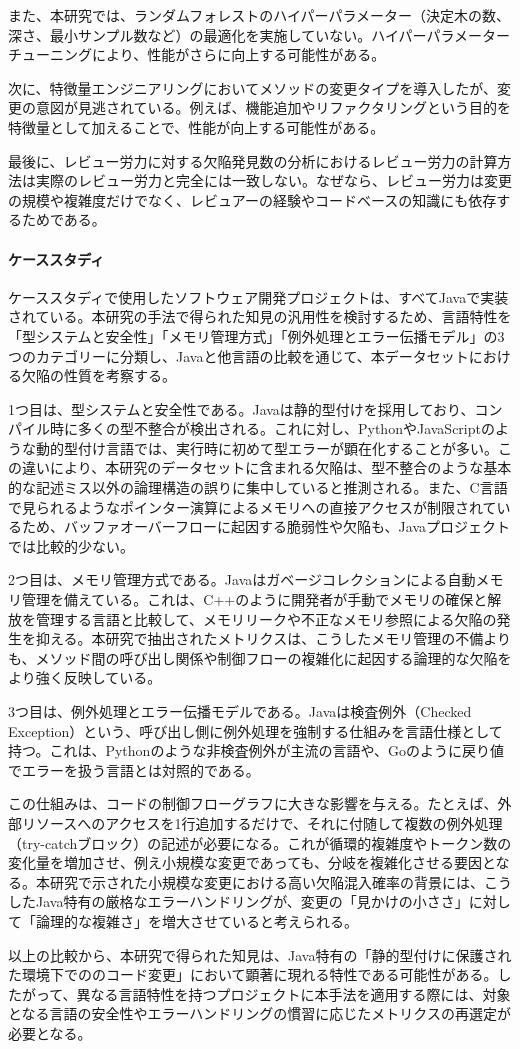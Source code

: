 また、本研究では、ランダムフォレストのハイパーパラメーター（決定木の数、深さ、最小サンプル数など）の最適化を実施していない。ハイパーパラメーターチューニングにより、性能がさらに向上する可能性がある。

次に、特徴量エンジニアリングにおいてメソッドの変更タイプを導入したが、変更の意図が見逃されている。例えば、機能追加やリファクタリングという目的を特徴量として加えることで、性能が向上する可能性がある。

最後に、レビュー労力に対する欠陥発見数の分析におけるレビュー労力の計算方法は実際のレビュー労力と完全には一致しない。なぜなら、レビュー労力は変更の規模や複雑度だけでなく、レビュアーの経験やコードベースの知識にも依存するためである。

\paragraph{ケーススタディ}
ケーススタディで使用したソフトウェア開発プロジェクトは、すべてJavaで実装されている。本研究の手法で得られた知見の汎用性を検討するため、言語特性を「型システムと安全性」「メモリ管理方式」「例外処理とエラー伝播モデル」の3つのカテゴリーに分類し、Javaと他言語の比較を通じて、本データセットにおける欠陥の性質を考察する。

1つ目は、型システムと安全性である。Javaは静的型付けを採用しており、コンパイル時に多くの型不整合が検出される。これに対し、PythonやJavaScriptのような動的型付け言語では、実行時に初めて型エラーが顕在化することが多い。この違いにより、本研究のデータセットに含まれる欠陥は、型不整合のような基本的な記述ミス以外の論理構造の誤りに集中していると推測される。また、C言語で見られるようなポインター演算によるメモリへの直接アクセスが制限されているため、バッファオーバーフローに起因する脆弱性や欠陥も、Javaプロジェクトでは比較的少ない。

2つ目は、メモリ管理方式である。Javaはガベージコレクションによる自動メモリ管理を備えている。これは、C++のように開発者が手動でメモリの確保と解放を管理する言語と比較して、メモリリークや不正なメモリ参照による欠陥の発生を抑える。本研究で抽出されたメトリクスは、こうしたメモリ管理の不備よりも、メソッド間の呼び出し関係や制御フローの複雑化に起因する論理的な欠陥をより強く反映している。

3つ目は、例外処理とエラー伝播モデルである。Javaは検査例外（Checked Exception）という、呼び出し側に例外処理を強制する仕組みを言語仕様として持つ。これは、Pythonのような非検査例外が主流の言語や、Goのように戻り値でエラーを扱う言語とは対照的である。

この仕組みは、コードの制御フローグラフに大きな影響を与える。たとえば、外部リソースへのアクセスを1行追加するだけで、それに付随して複数の例外処理（try-catchブロック）の記述が必要になる。これが循環的複雑度やトークン数の変化量を増加させ、例え小規模な変更であっても、分岐を複雑化させる要因となる。本研究で示された小規模な変更における高い欠陥混入確率の背景には、こうしたJava特有の厳格なエラーハンドリングが、変更の「見かけの小ささ」に対して「論理的な複雑さ」を増大させていると考えられる。

以上の比較から、本研究で得られた知見は、Java特有の「静的型付けに保護された環境下でののコード変更」において顕著に現れる特性である可能性がある。したがって、異なる言語特性を持つプロジェクトに本手法を適用する際には、対象となる言語の安全性やエラーハンドリングの慣習に応じたメトリクスの再選定が必要となる。